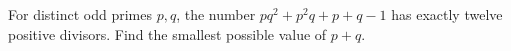 For distinct odd primes $p,q$, the number $pq^2+p^2q+p+q-1$ has exactly twelve positive divisors. Find the smallest possible value of $p+q$.
